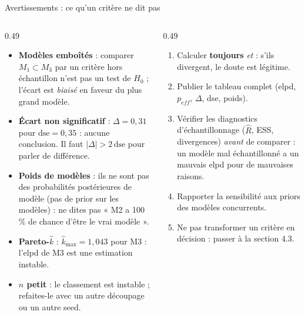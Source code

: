 \begin{frame}{Avertissements : ce qu'un critère ne dit pas}
\small
\begin{columns}[t]
\begin{column}{0.49\textwidth}
\begin{wbox}
\begin{itemize}
  \item \textbf{Modèles emboîtés} : comparer $M_1 \subset M_3$ par un critère
        hors échantillon n'est pas un test de $H_0$ ; l'écart est
        \emph{biaisé} en faveur du plus grand modèle.
  \item \textbf{Écart non significatif} : $\Delta = 0{,}31$ pour
        $\text{dse} = 0{,}35$ : aucune conclusion. Il faut
        $|\Delta| > 2\,\text{dse}$ pour parler de différence.
  \item \textbf{Poids de modèles} : ils ne sont pas des probabilités
        postérieures de modèle (pas de prior sur les modèles) : ne dites pas
        « M2 a 100\,\% de chance d'être le vrai modèle ».
  \item \textbf{Pareto-$\hat k$} : $\hat k_{\max} = 1{,}043$ pour M3 :
        l'elpd de M3 est une estimation instable.
  \item \textbf{$n$ petit} : le classement est instable ; refaites-le
        avec un autre découpage ou un autre seed.
\end{itemize}
\end{wbox}
\end{column}
\begin{column}{0.49\textwidth}
\begin{kbox}
\begin{enumerate}
  \item Calculer \textbf{toujours}  \emph{et}  :
        s'ils divergent, le doute est légitime.
  \item Publier le tableau complet (elpd, $p_{eff}$, $\Delta$, dse, poids).
  \item Vérifier les diagnostics d'échantillonnage ($\hat R$, ESS,
        divergences) \emph{avant} de comparer : un modèle mal échantillonné
        a un mauvais elpd pour de mauvaises raisons.
  \item Rapporter la sensibilité aux priors des modèles concurrents.
  \item Ne pas transformer un critère en décision : passer à la section 4.3.
\end{enumerate}
\end{kbox}
\end{column}
\end{columns}
\end{frame}

